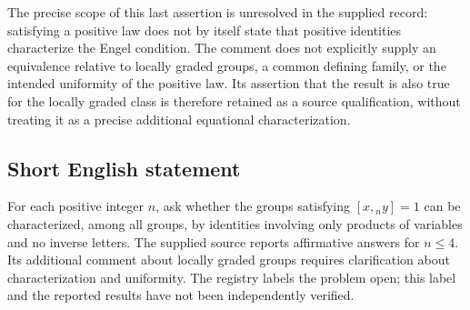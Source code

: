 \documentclass[11pt]{article}
\begin{document}
The precise scope of this last assertion is unresolved in the supplied record: satisfying a positive law does not by itself state that positive identities characterize the Engel condition. The comment does not explicitly supply an equivalence relative to locally graded groups, a common defining family, or the intended uniformity of the positive law. Its assertion that the result is also true for the locally graded class is therefore retained as a source qualification, without treating it as a precise additional equational characterization.
\subsection{Short English statement}
For each positive integer \(n\), ask whether the groups satisfying \([x,{}_{n}y]=1\) can be characterized, among all groups, by identities involving only products of variables and no inverse letters. The supplied source reports affirmative answers for \(n\leq 4\). Its additional comment about locally graded groups requires clarification about characterization and uniformity. The registry labels the problem open; this label and the reported results have not been independently verified.
\end{document}
